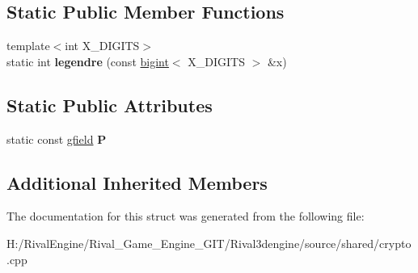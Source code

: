 \subsection*{Static Public Member Functions}
\begin{DoxyCompactItemize}
\item 
\mbox{\label{structgfield_afd5e9fde28aece20da7029f4fd9c1e81}} 
{\footnotesize template$<$int X\+\_\+\+D\+I\+G\+I\+TS$>$ }\\static int {\bfseries legendre} (const \hyperlink{structbigint}{bigint}$<$ X\+\_\+\+D\+I\+G\+I\+TS $>$ \&x)
\end{DoxyCompactItemize}
\subsection*{Static Public Attributes}
\begin{DoxyCompactItemize}
\item 
\mbox{\label{structgfield_a46e264cfc2176e14176ae9cfa31dee0e}} 
static const \hyperlink{structgfield}{gfield} {\bfseries P}
\end{DoxyCompactItemize}
\subsection*{Additional Inherited Members}


The documentation for this struct was generated from the following file\+:\begin{DoxyCompactItemize}
\item 
H\+:/\+Rival\+Engine/\+Rival\+\_\+\+Game\+\_\+\+Engine\+\_\+\+G\+I\+T/\+Rival3dengine/source/shared/crypto.\+cpp\end{DoxyCompactItemize}
